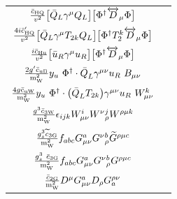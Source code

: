 \begin{tabular}{cC{9cm}}
    $\frac{\bar{c}_{\text{HQ}}}{v^2}\big[\bar Q_L \gamma^\mu Q_L\big] \big[ \Phi^\dag{\overleftrightarrow D}_\mu \Phi\big]$ & \\
    $\frac{4 i \bar{c}^{\prime}_{\text{HQ}}}{v^2}\big[\bar Q_L \gamma^\mu T_{2k} Q_L\big]  \big[\Phi^\dag T^k_2 {\overleftrightarrow D}_\mu \Phi\big]$ & \\
    $\frac{i \bar{c}_{\text{Hu}}}{v^2}\big[\bar u_R \gamma^\mu u_R\big] \big[ \Phi^\dag{\overleftrightarrow D}_\mu \Phi\big]$ & \\
    $\frac{2 g' \bar{c}_{\text{uB}}}{\text{m}_\text{W}^2}y_u\ \Phi^\dag \cdot {\bar Q}_L \gamma^{\mu\nu} u_R \  B_{\mu\nu}$ & \\
    $\frac{4 g \bar{c}_{\text{uW}}}{\text{m}_\text{W}^2}y_u\ \Phi^\dag \cdot \big({\bar Q}_L T_{2k}\big) \gamma^{\mu\nu} u_R  \ W_{\mu\nu}^k$ & \\
    $\frac{g^3 \bar{c}_{\text{3W}}}{\text{m}_\text{W}^2}\epsilon_{ijk} W_{\mu\nu}^i W^\nu{}^j_\rho W^{\rho\mu k}$ & \\
    $\frac{g_s^3 \widetilde{c}_{\text{3G}}}{\text{m}_\text{W}^2} f_{abc} G_{\mu\nu}^a G^\nu{}^b_\rho {\widetilde G}^{\rho\mu c}$ & \\
    $\frac{g_s^3\ \cthreeG}{\PmW^2} f_{abc} G_{\mu\nu}^a G^\nu{}^b_\rho G^{\rho\mu c}$ & \\
    $\frac{\bar{c}_{\text{2G}}}{\text{m}_\text{W}^2} D^\mu G_{\mu\nu}^a D_\rho G^{\rho\nu}_a$ & \\
    \bottomrule
  \end{tabular}

